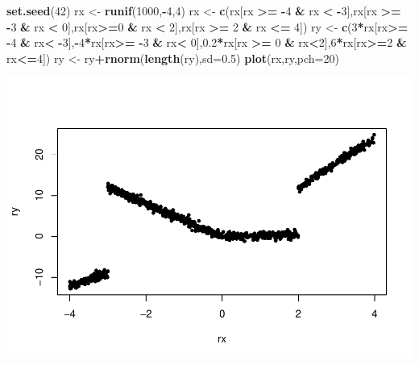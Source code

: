 \documentclass[
]{book}
\newenvironment{Shaded}{\begin{snugshade}}{\end{snugshade}}
\newcommand{\AttributeTok}[1]{\textcolor[rgb]{0.13,0.29,0.53}{#1}}
\newcommand{\DecValTok}[1]{\textcolor[rgb]{0.00,0.00,0.81}{#1}}
\newcommand{\FloatTok}[1]{\textcolor[rgb]{0.00,0.00,0.81}{#1}}
\newcommand{\FunctionTok}[1]{\textcolor[rgb]{0.13,0.29,0.53}{\textbf{#1}}}
\newcommand{\NormalTok}[1]{#1}
\newcommand{\OtherTok}[1]{\textcolor[rgb]{0.56,0.35,0.01}{#1}}
\newcommand{\SpecialCharTok}[1]{\textcolor[rgb]{0.81,0.36,0.00}{\textbf{#1}}}
\begin{document}
\begin{Shaded}
\begin{Highlighting}[]
\FunctionTok{set.seed}\NormalTok{(}\DecValTok{42}\NormalTok{)}
\NormalTok{rx }\OtherTok{\textless{}{-}} \FunctionTok{runif}\NormalTok{(}\DecValTok{1000}\NormalTok{,}\SpecialCharTok{{-}}\DecValTok{4}\NormalTok{,}\DecValTok{4}\NormalTok{)}
\NormalTok{rx }\OtherTok{\textless{}{-}} \FunctionTok{c}\NormalTok{(rx[rx }\SpecialCharTok{\textgreater{}=} \SpecialCharTok{{-}}\DecValTok{4} \SpecialCharTok{\&}\NormalTok{ rx }\SpecialCharTok{\textless{}} \SpecialCharTok{{-}}\DecValTok{3}\NormalTok{],rx[rx }\SpecialCharTok{\textgreater{}=} \SpecialCharTok{{-}}\DecValTok{3} \SpecialCharTok{\&}\NormalTok{ rx }\SpecialCharTok{\textless{}} \DecValTok{0}\NormalTok{],rx[rx}\SpecialCharTok{\textgreater{}=}\DecValTok{0} \SpecialCharTok{\&}\NormalTok{ rx }\SpecialCharTok{\textless{}} \DecValTok{2}\NormalTok{],rx[rx }\SpecialCharTok{\textgreater{}=} \DecValTok{2} \SpecialCharTok{\&}\NormalTok{ rx }\SpecialCharTok{\textless{}=} \DecValTok{4}\NormalTok{])}
\NormalTok{ry }\OtherTok{\textless{}{-}} \FunctionTok{c}\NormalTok{(}\DecValTok{3}\SpecialCharTok{*}\NormalTok{rx[rx}\SpecialCharTok{\textgreater{}=} \SpecialCharTok{{-}}\DecValTok{4} \SpecialCharTok{\&}\NormalTok{ rx}\SpecialCharTok{\textless{}} \SpecialCharTok{{-}}\DecValTok{3}\NormalTok{],}\SpecialCharTok{{-}}\DecValTok{4}\SpecialCharTok{*}\NormalTok{rx[rx}\SpecialCharTok{\textgreater{}=} \SpecialCharTok{{-}}\DecValTok{3} \SpecialCharTok{\&}\NormalTok{ rx}\SpecialCharTok{\textless{}} \DecValTok{0}\NormalTok{],}\FloatTok{0.2}\SpecialCharTok{*}\NormalTok{rx[rx }\SpecialCharTok{\textgreater{}=} \DecValTok{0} \SpecialCharTok{\&}\NormalTok{ rx}\SpecialCharTok{\textless{}}\DecValTok{2}\NormalTok{],}\DecValTok{6}\SpecialCharTok{*}\NormalTok{rx[rx}\SpecialCharTok{\textgreater{}=}\DecValTok{2} \SpecialCharTok{\&}\NormalTok{ rx}\SpecialCharTok{\textless{}=}\DecValTok{4}\NormalTok{])}
\NormalTok{ry }\OtherTok{\textless{}{-}}\NormalTok{ ry}\SpecialCharTok{+}\FunctionTok{rnorm}\NormalTok{(}\FunctionTok{length}\NormalTok{(ry),}\AttributeTok{sd=}\FloatTok{0.5}\NormalTok{)}
\FunctionTok{plot}\NormalTok{(rx,ry,}\AttributeTok{pch=}\DecValTok{20}\NormalTok{)}
\end{Highlighting}
\end{Shaded}

\includegraphics{_main_files/figure-latex/unnamed-chunk-25-1.pdf}
\end{document}
